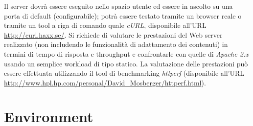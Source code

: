 \documentclass[paper=a4, oneside, fontsize=14pt, titlepage]{article}
\begin{document}
\begin{flushleft}
		Il server dovrà essere eseguito nello spazio utente ed essere in ascolto su una porta di default (configurabile); potrà essere testato tramite un browser reale o tramite un tool a riga di comando quale \textit{cURL}, disponibile all’URL \url{http://curl.haxx.se/}.
		Si richiede di valutare le prestazioni del Web server realizzato (non includendo le funzionalità  di adattamento dei contenuti) in termini di tempo di risposta e throughput e confrontarle con quelle di \textit{Apache 2.x} usando un semplice workload di tipo statico. La valutazione delle prestazioni può essere effettuata utilizzando il tool di benchmarking \textit{httperf} (disponibile all’URL \url{http://www.hpl.hp.com/personal/David\_Mosberger/httperf.html}).
	\end{flushleft}
	
	\section{Environment}
\end{document}
